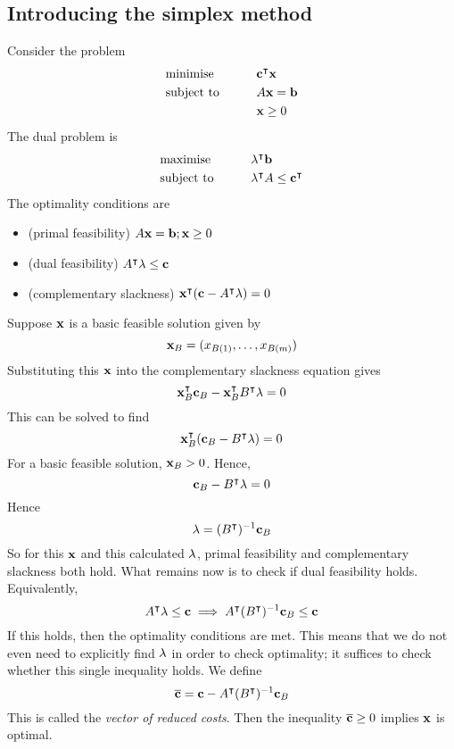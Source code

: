 \subsection{Introducing the simplex method}
Consider the problem
\begin{alignat*}{2}
	 & \text{minimise}   & \qquad & \vb c^\intercal \vb x \\
	 & \text{subject to} &        & A \vb x = \vb b        \\
	 &                   &        & \vb x \geq 0
\end{alignat*}
The dual problem is
\begin{alignat*}{2}
	 & \text{maximise}   & \qquad & \vb \lambda^\intercal \vb b                   \\
	 & \text{subject to} &        & \vb \lambda^\intercal A \leq \vb c^\intercal \\
\end{alignat*}
The optimality conditions are
\begin{itemize}
	\item (primal feasibility) \( A \vb x = \vb b; \vb x \geq 0 \)
	\item (dual feasibility) \( A^\intercal \vb \lambda \leq \vb c \)
	\item (complementary slackness) \( \vb x^\intercal (\vb c - A^\intercal \vb \lambda) = 0 \)
\end{itemize}
Suppose \( \vb x \) is a basic feasible solution given by
\[
	\vb x_B = (x_{B(1)}, \dots, x_{B(m)})
\]
Substituting this \( \vb x \) into the complementary slackness equation gives
\[
	\vb x_B^\intercal \vb c_B - \vb x_B^\intercal B^\intercal \vb \lambda = 0
\]
This can be solved to find
\[
	\vb x_B^\intercal (\vb c_B - B^\intercal \vb \lambda) = 0
\]
For a basic feasible solution, \( \vb x_B > 0 \).
Hence,
\[
	\vb c_B - B^\intercal \vb \lambda = 0
\]
Hence
\[
	\vb \lambda = (B^\intercal)^{-1} \vb c_B
\]
So for this \( \vb x \) and this calculated \( \vb \lambda \), primal feasibility and complementary slackness both hold.
What remains now is to check if dual feasibility holds.
Equivalently,
\[
	A^\intercal \vb \lambda \leq \vb c \implies A^\intercal (B^\intercal)^{-1} \vb c_B \leq \vb c
\]
If this holds, then the optimality conditions are met.
This means that we do not even need to explicitly find \( \vb \lambda \) in order to check optimality; it suffices to check whether this single inequality holds.
We define
\[
	\overline{\vb c} = \vb c - A^\intercal (B^\intercal)^{-1} \vb c_B
\]
This is called the \textit{vector of reduced costs}.
Then the inequality \( \overline{\vb c} \geq 0 \) implies \( \vb x \) is optimal.
